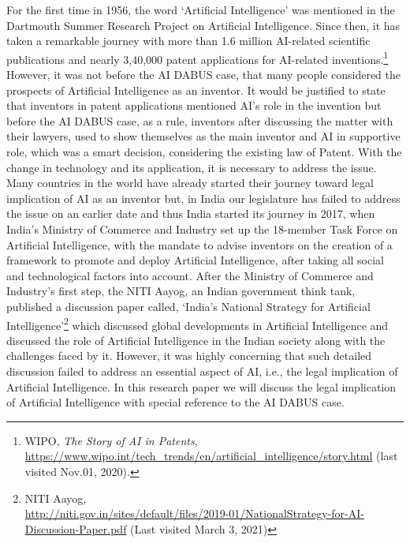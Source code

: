 \setcounter{figure}{0}
\setcounter{table}{0}
\setcounter{footnote}{0}

\label{2021-art3}



\begin{multicols}{2}


\noi
For the first time in 1956, the word ‘Artificial Intelligence’ was mentioned in the Dartmouth
Summer Research Project on Artificial Intelligence. Since then, it has taken a remarkable
journey with more than 1.6 million AI-related scientific publications and nearly 3,40,000
patent applications for AI-related inventions.\footnote{WIPO, \textit{The Story of AI in Patents}, \url{https://www.wipo.int/tech_trends/en/artificial_intelligence/story.html} (last
visited Nov.01, 2020).}
However, it was not before the AI DABUS
case, that many people considered the prospects of Artificial Intelligence as an inventor. It
would be justified to state that inventors in patent applications mentioned AI’s role in the
invention but before the AI DABUS case, as a rule, inventors after discussing the matter
with their lawyers, used to show themselves as the main inventor and AI in supportive role,
which was a smart decision, considering the existing law of Patent. With the change in
technology and its application, it is necessary to address the issue. Many countries in the
world have already started their journey toward legal implication of AI as an inventor but, in
India our legislature has failed to address the issue on an earlier date and thus India started
its journey in 2017, when India’s Ministry of Commerce and Industry set up the 18-member
Task Force on Artificial Intelligence, with the mandate to advise inventors on the creation of
a framework to promote and deploy Artificial Intelligence, after taking all social and
technological factors into account. After the Ministry of Commerce and Industry’s first step,
the NITI Aayog, an Indian government think tank, published a discussion paper called,
‘India’s National Strategy for Artificial Intelligence’\footnote{NITI Aayog,\\ \url{http://niti.gov.in/sites/default/files/2019-01/NationalStrategy-for-AI-Discussion-Paper.pdf} (Last
visited March 3, 2021)}
which discussed global developments
in Artificial Intelligence and discussed the role of Artificial Intelligence in the Indian society
along with the challenges faced by it. However, it was highly concerning that such detailed
discussion failed to address an essential aspect of AI, i.e., the legal implication of Artificial Intelligence. In this research paper we will discuss the legal implication of Artificial
Intelligence with special reference to the AI DABUS case.


\end{multicols}
